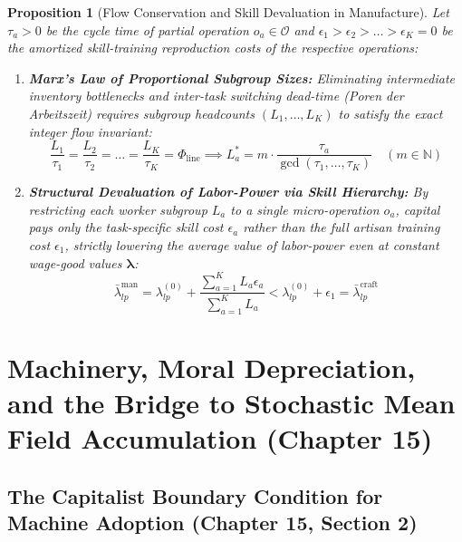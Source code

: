 \documentclass[11pt,a4paper]{article}
\newtheorem{proposition}{Proposition}[section]
\begin{document}
\begin{proposition}[Flow Conservation and Skill Devaluation in Manufacture]
Let $\tau_a > 0$ be the cycle time of partial operation $o_a \in \mathcal{O}$ and $\epsilon_1 > \epsilon_2 > \dots > \epsilon_K = 0$ be the amortized skill-training reproduction costs of the respective operations:
\begin{enumerate}[label=(\arabic*)]
    \item \textbf{Marx's Law of Proportional Subgroup Sizes:} Eliminating intermediate inventory bottlenecks and inter-task switching dead-time (\textit{Poren der Arbeitszeit}) requires subgroup headcounts $(L_1, \dots, L_K)$ to satisfy the exact integer flow invariant:
    \begin{equation}
        \frac{L_1}{\tau_1} = \frac{L_2}{\tau_2} = \dots = \frac{L_K}{\tau_K} = \Phi_{\text{line}} \implies L_a^* = m \cdot \frac{\tau_a}{\gcd(\tau_1, \dots, \tau_K)} \quad (m \in \mathbb{N})
    \end{equation}
    \item \textbf{Structural Devaluation of Labor-Power via Skill Hierarchy:} By restricting each worker subgroup $L_a$ to a single micro-operation $o_a$, capital pays only the task-specific skill cost $\epsilon_a$ rather than the full artisan training cost $\epsilon_1$, strictly lowering the average value of labor-power even at constant wage-good values $\boldsymbol{\lambda}$:
    \begin{equation}
        \bar{\lambda}_{lp}^{\text{man}} = \lambda_{lp}^{(0)} + \frac{\sum_{a=1}^K L_a \epsilon_a}{\sum_{a=1}^K L_a} < \lambda_{lp}^{(0)} + \epsilon_1 = \bar{\lambda}_{lp}^{\text{craft}}
    \end{equation}
\end{enumerate}
\end{proposition}

\section{Machinery, Moral Depreciation, and the Bridge to Stochastic Mean Field Accumulation (Chapter 15)}

\subsection{The Capitalist Boundary Condition for Machine Adoption (Chapter 15, Section 2)}
\end{document}
